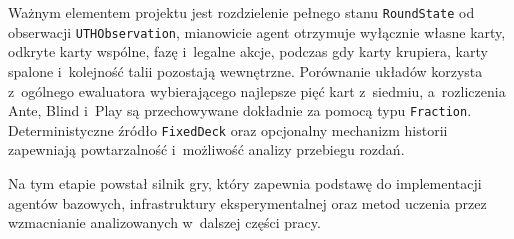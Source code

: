 Ważnym elementem projektu jest rozdzielenie pełnego stanu
\texttt{RoundState} od obserwacji \texttt{UTHObservation}, mianowicie agent otrzymuje
wyłącznie własne karty, odkryte karty wspólne, fazę i~legalne akcje, podczas
gdy karty krupiera, karty spalone i~kolejność talii pozostają wewnętrzne.
Porównanie układów korzysta z~ogólnego ewaluatora wybierającego najlepsze pięć kart
z~siedmiu, a~rozliczenia Ante, Blind i~Play są przechowywane dokładnie za
pomocą typu \texttt{Fraction}. Deterministyczne źródło \texttt{FixedDeck}
oraz opcjonalny mechanizm historii zapewniają powtarzalność i~możliwość
analizy przebiegu rozdań.

Na tym etapie powstał silnik gry, który zapewnia podstawę do implementacji agentów bazowych, infrastruktury eksperymentalnej oraz metod uczenia przez wzmacnianie analizowanych w~dalszej części pracy.
